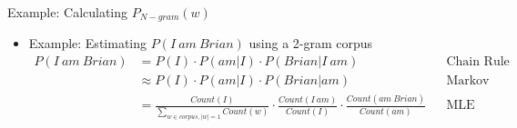 \documentclass[16:9,en,navbarinfooter]{sdqbeamer}
\begin{document}
\begin{frame}{Example: Calculating $P_{N-gram}(w)$}
\begin{itemize}
    \item Example: Estimating $P(I\ am\ Brian)$ using a 2-gram corpus
\begin{equation*}
\begin{aligned}
P(I\ am\ Brian) &=       P(I)                                        \cdot P(am|I)                        \cdot P(Brian|I\ am)             \qquad &&  \text{Chain Rule} \\
                &\approx P(I)                                        \cdot P(am|I)                        \cdot P(Brian| am)                      &&  \text{Markov Assumption} \\
                &= \frac {Count(I)} {\sum_{w \in corpus, |w| = 1} Count(w) } \cdot \frac {Count(I\ am)} {Count(I)}        \cdot \frac {Count(am\ Brian)}{Count(am)}       &&  \text{MLE} 
\end{aligned}
\end{equation*}
\end{itemize}


\end{frame}
\end{document}

